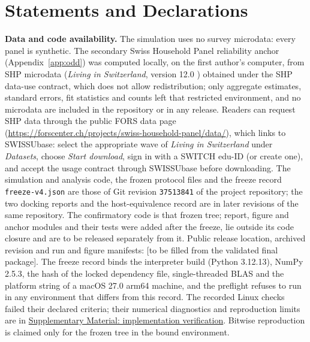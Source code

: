 \documentclass[pdflatex,sn-mathphys-num,iicol]{sn-jnl}
\begin{document}
\section*{Statements and Declarations}
\noindent\textbf{Data and code availability.}
The simulation uses no survey microdata: every panel is synthetic. %
The secondary Swiss Household Panel reliability anchor (Appendix~\ref{app:odd}) was computed locally, on the first author's computer, from SHP microdata (\emph{Living in Switzerland}, version 12.0 \cite{shpgroup2026data}) obtained under the SHP data-use contract, which does not allow redistribution; only aggregate estimates, standard errors, fit statistics and counts left that restricted environment, and no microdata are included in the repository or in any release. %
Readers can request SHP data through the public FORS data page (\url{https://forscenter.ch/projects/swiss-household-panel/data/}), which links to SWISSUbase: select the appropriate wave of \emph{Living in Switzerland} under \emph{Datasets}, choose \emph{Start download}, sign in with a SWITCH edu-ID (or create one), and accept the usage contract through SWISSUbase before downloading. %
The simulation and analysis code, the frozen protocol files and the freeze record \texttt{freeze-v4.json} are those of Git revision \texttt{37513841} of the project repository; the two docking reports and the host-equivalence record are in later revisions of the same repository. %
The confirmatory code is that frozen tree; report, figure and anchor modules and their tests were added after the freeze, lie outside its code closure and are to be released separately from it. %
Public release location, archived revision and run and figure manifests: [to be filled from the validated final package]. %
The freeze record binds the interpreter build (Python 3.12.13), NumPy 2.5.3, the hash of the locked dependency file, single-threaded BLAS and the platform string of a macOS 27.0 arm64 machine, and the preflight refuses to run in any environment that differs from this record. %
The recorded Linux checks failed their declared criteria; their numerical diagnostics and reproduction limits are in \hyperref[supp:verification-details]{Supplementary Material: implementation verification}. %
Bitwise reproduction is claimed only for the frozen tree in the bound environment. %
\end{document}
